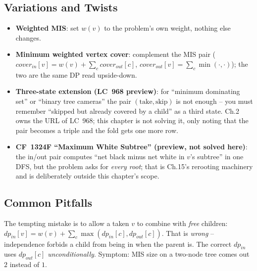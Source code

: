 \subsection{Variations and Twists}

\begin{itemize}[nosep]
  \item \textbf{Weighted MIS}: set $w(v)$ to the problem's own weight,
        nothing else changes. \hfill{}
  \item \textbf{Minimum weighted vertex cover}: complement the MIS pair
        ($\mathit{cover}_{\mathit{in}}[v]=w(v)+\sum_c\mathit{cover}_{\mathit{out}}[c]$,
        $\mathit{cover}_{\mathit{out}}[v]=\sum_c\min(\cdot,\cdot)$);
        the two are the same DP read upside-down. \hfill{}
  \item \textbf{Three-state extension (LC~968 preview)}: for
        ``minimum dominating set'' or ``binary tree cameras'' the pair
        $(\text{take},\text{skip})$ is not enough -- you must remember
        ``skipped but already covered by a child'' as a third state.
        Ch.2 owns the URL of LC~968; this chapter is not solving it, only
        noting that the pair becomes a triple and the fold gets one more
        row. \hfill{}
  \item \textbf{CF~1324F ``Maximum White Subtree'' (preview, not solved
        here)}: the in/out pair computes ``net black minus net white in
        $v$'s subtree'' in one DFS, but the problem asks for
        \emph{every root}; that is Ch.15's rerooting machinery and is
        deliberately outside this chapter's scope. \hfill{}
\end{itemize}

\subsection{Common Pitfalls}

\begin{warningbox}
The tempting mistake is to allow a taken $v$ to combine with \emph{free}
children: $\mathit{dp}_{\mathit{in}}[v]=w(v)+\sum_c\max(
\mathit{dp}_{\mathit{in}}[c],\mathit{dp}_{\mathit{out}}[c])$. That is
\emph{wrong} -- independence forbids a child from being in when the parent
is. The correct $\mathit{dp}_{\mathit{in}}$ uses $\mathit{dp}_{\mathit{out}}[c]$
\emph{unconditionally}. Symptom: MIS size on a two-node tree comes out $2$
instead of $1$.
\end{warningbox}

